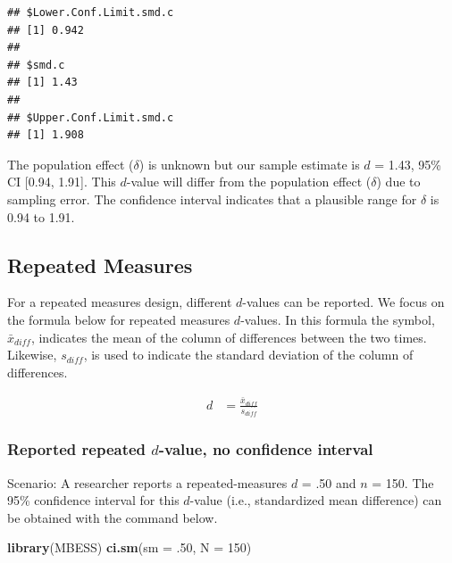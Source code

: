 \documentclass[
]{krantz}
\makeatletter
\newenvironment{Shaded}{\begin{snugshade}}{\end{snugshade}}
\newcommand{\DataTypeTok}[1]{\textcolor[rgb]{0.27,0.27,0.27}{#1}}
\newcommand{\DecValTok}[1]{\textcolor[rgb]{0.06,0.06,0.06}{#1}}
\newcommand{\FloatTok}[1]{\textcolor[rgb]{0.06,0.06,0.06}{#1}}
\newcommand{\KeywordTok}[1]{\textcolor[rgb]{0.27,0.27,0.27}{\textbf{#1}}}
\newcommand{\NormalTok}[1]{#1}
\newenvironment{kframe}{%
\medskip{}
\setlength{\fboxsep}{.8em}
 \def\at@end@of@kframe{}%
 \ifinner\ifhmode%
  \def\at@end@of@kframe{\end{minipage}}%
  \begin{minipage}{\columnwidth}%
 \fi\fi%
 \def\FrameCommand##1{\hskip\@totalleftmargin \hskip-\fboxsep
 \colorbox{shadecolor}{##1}\hskip-\fboxsep
     \hskip-\linewidth \hskip-\@totalleftmargin \hskip\columnwidth}%
 \MakeFramed {\advance\hsize-\width
   \@totalleftmargin\z@ \linewidth\hsize
   \@setminipage}}%
 {\par\unskip\endMakeFramed%
 \at@end@of@kframe}
\renewenvironment{Shaded}{\begin{kframe}}{\end{kframe}}
\makeatother
\begin{document}
\begin{verbatim}
## $Lower.Conf.Limit.smd.c
## [1] 0.942
## 
## $smd.c
## [1] 1.43
## 
## $Upper.Conf.Limit.smd.c
## [1] 1.908
\end{verbatim}

The population effect (\(\delta\)) is unknown but our sample estimate is \(d\) = 1.43, 95\% CI {[}0.94, 1.91{]}. This \(d\)-value will differ from the population effect (\(\delta\)) due to sampling error. The confidence interval indicates that a plausible range for \(\delta\) is 0.94 to 1.91.

\hypertarget{repeated-measures}{%
\subsection{Repeated Measures}\label{repeated-measures}}

For a repeated measures design, different \(d\)-values can be reported. We focus on the formula below for repeated measures \(d\)-values. In this formula the symbol, \(\bar{x}_{diff}\), indicates the mean of the column of differences between the two times. Likewise, \(s_{diff}\), is used to indicate the standard deviation of the column of differences.

\[
\begin{aligned}
d & = \frac{\bar{x}_{diff}}{s_{diff}}
\end{aligned}
\]

\hypertarget{reported-repeated-d-value-no-confidence-interval}{%
\subsubsection{\texorpdfstring{Reported repeated \(d\)-value, no confidence interval}{Reported repeated d-value, no confidence interval}}\label{reported-repeated-d-value-no-confidence-interval}}

Scenario: A researcher reports a repeated-measures \(d\) = .50 and \(n\) = 150. The 95\% confidence interval for this \(d\)-value (i.e., standardized mean difference) can be obtained with the command below.

\begin{Shaded}
\begin{Highlighting}[]
\KeywordTok{library}\NormalTok{(MBESS)}
\KeywordTok{ci.sm}\NormalTok{(}\DataTypeTok{sm =} \FloatTok{.50}\NormalTok{, }\DataTypeTok{N =} \DecValTok{150}\NormalTok{) }
\end{Highlighting}
\end{Shaded}
\end{document}
